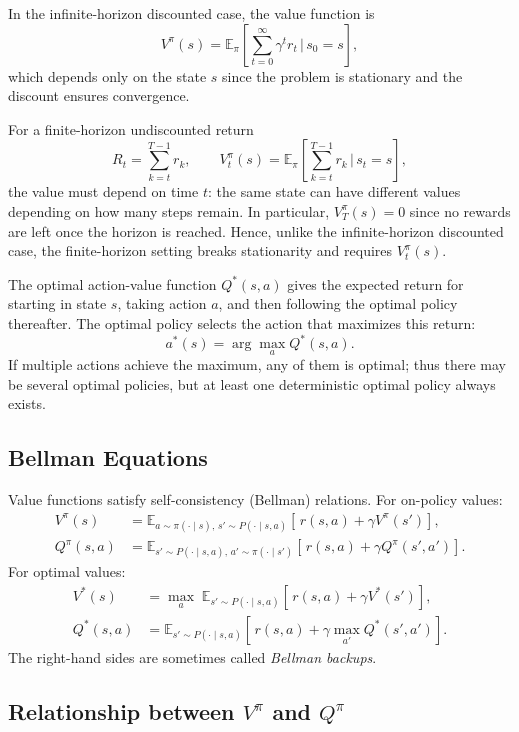 In the infinite-horizon discounted case, the value function is
\[
V^\pi(s) = \mathbb{E}_\pi \!\left[\sum_{t=0}^\infty \gamma^t r_t \,\Big|\, s_0=s \right],
\]
which depends only on the state $s$ since the problem is stationary and the discount ensures convergence.  

For a finite-horizon undiscounted return
\[
R_t = \sum_{k=t}^{T-1} r_k, \qquad 
V_t^\pi(s) = \mathbb{E}_\pi \!\left[\sum_{k=t}^{T-1} r_k \,\Big|\, s_t=s \right],
\]
the value must depend on time $t$: the same state can have different values depending on how many steps remain. In particular, $V_T^\pi(s)=0$ since no rewards are left once the horizon is reached. Hence, unlike the infinite-horizon discounted case, the finite-horizon setting breaks stationarity and requires $V_t^\pi(s)$.

The optimal action-value function $Q^*(s,a)$ gives the expected return for starting
in state $s$, taking action $a$, and then following the optimal policy thereafter.
The optimal policy selects the action that maximizes this return:
\[
a^*(s) = \arg\max_a Q^*(s,a).
\]
If multiple actions achieve the maximum, any of them is optimal; thus there may be
several optimal policies, but at least one deterministic optimal policy always exists.



\subsection{Bellman Equations}
Value functions satisfy self-consistency (Bellman) relations. For on-policy values:
\begin{align}
V^{\pi}(s) &= \mathbb{E}_{a\sim \pi(\cdot\mid s),\, s'\sim P(\cdot\mid s,a)}\!\left[\, r(s,a) + \gamma V^{\pi}(s') \right], \\
Q^{\pi}(s,a) &= \mathbb{E}_{s'\sim P(\cdot\mid s,a),\, a'\sim \pi(\cdot\mid s')}\!\left[\, r(s,a) + \gamma Q^{\pi}(s',a') \right].
\end{align}
For optimal values:
\begin{align}
V^{*}(s) &= \max_{a}\; \mathbb{E}_{s'\sim P(\cdot\mid s,a)}\!\left[\, r(s,a) + \gamma V^{*}(s') \right], \\
Q^{*}(s,a) &= \mathbb{E}_{s'\sim P(\cdot\mid s,a)}\!\left[\, r(s,a) + \gamma \max_{a'} Q^{*}(s',a') \right].
\end{align}
The right-hand sides are sometimes called \emph{Bellman backups}. \cite{spinningup_rl_intro}

\subsection{Relationship between $V^\pi$ and $Q^\pi$}

